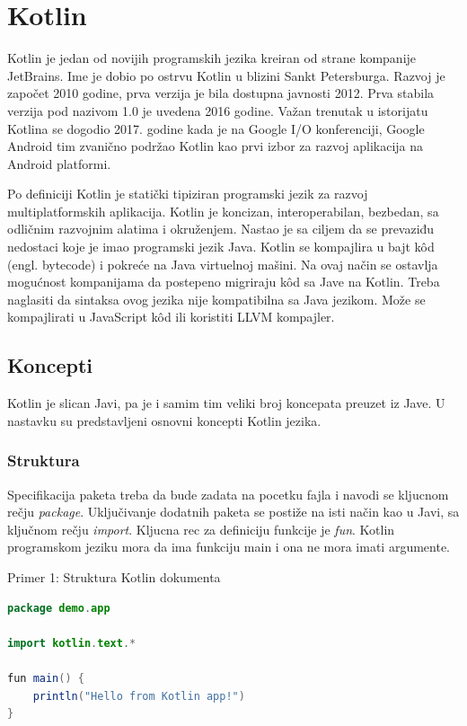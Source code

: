 \documentclass[12pt,oneside]{memoir}
\begin{document}
\section{Kotlin}
Kotlin je jedan od novijih programskih jezika kreiran od strane kompanije JetBrains. Ime je dobio po ostrvu Kotlin u blizini Sankt Petersburga. Razvoj je započet 2010 godine, prva verzija je bila dostupna javnosti 2012. Prva stabila verzija pod nazivom 1.0 je uvedena 2016 godine. Važan trenutak u istorijatu Kotlina se dogodio 2017. godine kada je na Google I/O konferenciji, Google Android tim zvanično podržao Kotlin kao prvi izbor za razvoj aplikacija na Android platformi. 
 
 
Po definiciji Kotlin je statički tipiziran programski jezik za razvoj multiplatformskih aplikacija. Kotlin je koncizan, interoperabilan, bezbedan, sa odličnim razvojnim alatima i okruženjem. Nastao je sa ciljem da se prevaziđu nedostaci koje je imao programski jezik Java. Kotlin se kompajlira u bajt kôd (engl. bytecode) i pokreće na Java virtuelnoj mašini. Na ovaj način se ostavlja mogućnost kompanijama da postepeno migriraju kôd sa Jave na Kotlin. Treba naglasiti da sintaksa ovog jezika nije kompatibilna sa Java jezikom. Može se kompajlirati u JavaScript kôd ili koristiti LLVM kompajler.

 
\subsection{Koncepti}
Kotlin je slican Javi, pa je i samim tim veliki broj koncepata preuzet iz Jave. U nastavku su predstavljeni osnovni koncepti Kotlin jezika. 
\subsubsection{Struktura}
Specifikacija paketa treba da bude zadata na pocetku fajla i navodi se kljucnom rečju \emph{package}. Uključivanje dodatnih paketa se postiže na isti način kao u Javi, sa ključnom rečju \emph{import}. Kljucna rec za definiciju funkcije je \emph{fun}. Kotlin programskom jeziku mora da ima funkciju main i ona ne mora imati argumente. 
 
\begin{center} Primer 1: Struktura Kotlin dokumenta\end{center}
\begin{lstlisting}[language=Java]
package demo.app
 
import kotlin.text.*
 
fun main() {
    println("Hello from Kotlin app!")
}
\end{lstlisting}
 
\end{document}
